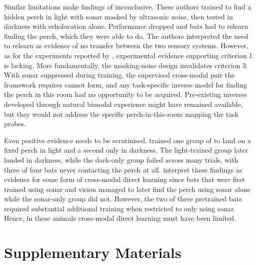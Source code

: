 \documentclass[11pt]{article}
\begin{document}
Similar limitations make findings of \citet{Holland2005} inconclusive. These authors trained  to find a hidden perch in light with sonar masked by ultrasonic noise, then tested in darkness with echolocation alone. Performance dropped and bats had to relearn finding the perch, which they were able to do. The authors interpreted the need to relearn as evidence of no transfer between the two sensory systems. However, as for the experiments reported by \citet{Danilovich2019}, experimental evidence supporting criterion 1 is lacking. More fundamentally, the masking-noise design invalidates criterion 3. With sonar suppressed during training, the supervised cross-modal pair the framework requires cannot form, and any task-specific inverse model for finding the perch in this room had no opportunity to be acquired. Pre-existing inverses developed through natural bimodal experience might have remained available, but they would not address the specific perch-in-this-room mapping the task probes.


Even positive evidence needs to be scrutinised. \citet{Finger2025} trained one group of  to land on a fixed perch in light and a second only in darkness. The light-trained group later landed in darkness, while the dark-only group failed across many trials, with three of four bats never contacting the perch at all. \citet{Finger2025} interpret these findings as evidence for some form of cross-modal direct learning since bats that were first trained using sonar and vision managed to later find the perch using sonar alone while the sonar-only group did not. However, the two of three pretrained bats required substantial additional training when restricted to only using sonar. Hence, in these animals cross-modal direct learning must have been limited.





\clearpage
\section*{Supplementary Materials}
\setcounter{table}{0}
\setcounter{figure}{0}
\renewcommand{\thetable}{S\arabic{table}}
\renewcommand{\thefigure}{S\arabic{figure}}
\end{document}
